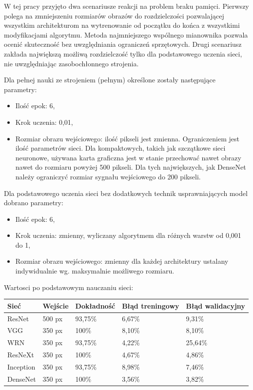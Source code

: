 \documentclass[12pt,a4paper,twoside,titlepage,openright]{book}
\begin{document}
W tej pracy przyjęto dwa scenariusze reakcji na problem braku pamięci. Pierwszy polega na zmniejszeniu rozmiarów obrazów do rozdzielczości pozwalającej wszystkim architekturom na wytrenowanie od początku do końca z wszystkimi modyfikacjami algorytmu. Metoda najmniejszego wspólnego mianownika pozwala ocenić skuteczność bez uwzględniania ograniczeń sprzętowych. Drugi scenariusz zakłada największą możliwą rozdzielczość tylko dla podstawowego uczenia sieci, nie uwzględniając zasobochłonnego strojenia.

Dla pełnej nauki ze strojeniem (pełnym) określone zostały następujące parametry:
\begin{itemize}
\item Ilość epok: 6,
\item Krok uczenia: 0,01,
\item Rozmiar obrazu wejściowego: ilość pikseli jest zmienna. Ograniczeniem jest ilość parametrów sieci. Dla kompaktowych, takich jak szczątkowe sieci neuronowe, używana karta graficzna jest w stanie przechować nawet obrazy nawet do rozmiaru powyżej 500 pikseli. Dla tych największych, jak DenseNet należy ograniczyć rozmiar sygnału wejściowego do 200 pikseli.
\end{itemize}

Dla podstawowego uczenia sieci bez dodatkowych technik usprawniających model dobrano parametry:
\begin{itemize}
\item Ilość epok: 6,
\item Krok uczenia: zmienny, wyliczany algorytmem dla różnych warstw od 0,001 do 1,
\item Rozmiar obrazu wejściowego: zmienny dla każdej architektury ustalany indywidualnie wg. maksymalnie możliwego rozmiaru.
\end{itemize}

Wartosci po podstawowym nauczaniu sieci:
\begin{center}
    \begin{tabular}{ | l | l | l | l | l |}
    \hline
    Sieć & Wejście & Dokładność & Błąd treningowy & Błąd walidacyjny \\ \hline
    ResNet & 500 px & 93,75\% & 6,67\% & 9,31\% \\ \hline
    VGG & 350 px & 100\%& 8,10\% & 8,10\%\\ \hline
    WRN & 350 px & 93,75\% & 4,22\% & 25,64\% \\ \hline
    ResNeXt & 350 px & 100\%& 4,67\% & 4,86\%\\\hline
    Inception & 350 px & 93,75\% & 8,98\% & 7,46\% \\ \hline
    DenseNet & 350 px & 100\% & 3,56\% & 3,82\% \\ \hline
    \end{tabular}
\end{center}
\end{document}

